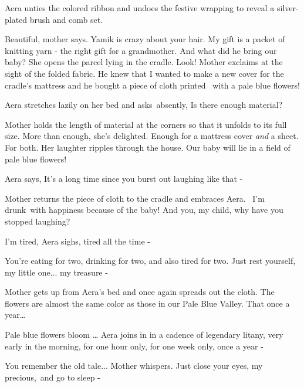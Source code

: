 \documentclass[12pt]{book}
\begin{document}
Aera unties the colored ribbon and undoes the festive wrapping to reveal a silver-plated brush and comb set.

{\textquotedbl}Beautiful,{\textquotedbl} mother says. {\textquotedbl}Yamik is crazy about your hair. My gift is a packet
of knitting yarn - the right gift for a grandmother. And what did he bring our baby?{\textquotedbl} She opens the
parcel lying in the cradle. {\textquotedbl}Look!{\textquotedbl} Mother exclaims at the sight of the folded fabric.
{\textquotedbl}He knew that I wanted to make a new cover for the cradle's mattress and he bought a piece of cloth
printed \ with a pale blue flowers!{\textquotedbl}

Aera stretches lazily on her bed and asks~absently, {\textquotedbl}Is there enough material?{\textquotedbl}

Mother holds the length of material at the corners so that it unfolds to its full size. {\textquotedbl}More than
enough,{\textquotedbl} she's delighted. {\textquotedbl}Enough for a mattress cover \textit{and} a sheet. For
both.{\textquotedbl} Her laughter ripples through the house. {\textquotedbl}Our baby will lie in a field of pale blue
flowers!{\textquotedbl}

Aera says, {\textquotedbl}It's a long time since you burst out laughing like that -{\textquotedbl}

Mother returns the piece of cloth to the cradle and embraces Aera. ~{\textquotedbl}I'm drunk~with happiness because of
the baby! And you, my child, why have you stopped laughing?{\textquotedbl}

{\textquotedbl}I'm tired,{\textquotedbl} Aera sighs, {\textquotedbl}tired all the time -{\textquotedbl}

{\textquotedbl}You're eating for two, drinking for two, and also tired for two. Just rest yourself, my little one... my
treasure -{\textquotedbl}~

Mother gets up from Aera's bed and once again spreads out the cloth. {\textquotedbl}The flowers are almost the same
color as those in our Pale Blue Valley. That once a year{\dots}{\textquotedbl}

{\textquotedbl}Pale blue flowers bloom {\dots}{\textquotedbl} Aera joins in in a cadence of legendary litany,
{\textquotedbl}very early in the morning, for one hour only, for one week only, once a year -{\textquotedbl}

{\textquotedbl}You remember the old tale...{\textquotedbl} Mother whispers. {\textquotedbl}Just close your eyes, my
precious,~and go to sleep -{\textquotedbl}
\end{document}
